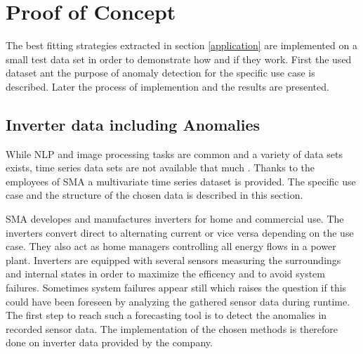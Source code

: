 \section{Proof of Concept}\label{implementation}
The best fitting strategies extracted in section \ref{application} are implemented on a small test data set in order to demonstrate how and if they work. First the used dataset ant the purpose of anomaly detection for the specific use case is described. Later the process of implemention and the results are presented.
\subsection{Inverter data including Anomalies}
While NLP and image processing tasks are common and a variety of data sets exists, time series data sets are not available that much . Thanks to the employees of SMA a multivariate time series dataset is provided. The specific use case and the structure of the chosen data is described in this section.

SMA developes and manufactures inverters for home and commercial use. The inverters convert direct to alternating current or vice versa depending on the use case. They also act as home managers controlling all energy flows in a power plant. Inverters are equipped with several sensors measuring the surroundings and internal states in order to maximize the efficency and to avoid system failures. Sometimes system failures appear still which raises the question if this could have been foreseen by analyzing the gathered sensor data during runtime. The first step to reach such a forecasting tool is to detect the anomalies in recorded sensor data. The implementation of the chosen methods is therefore done on inverter data provided by the company.


